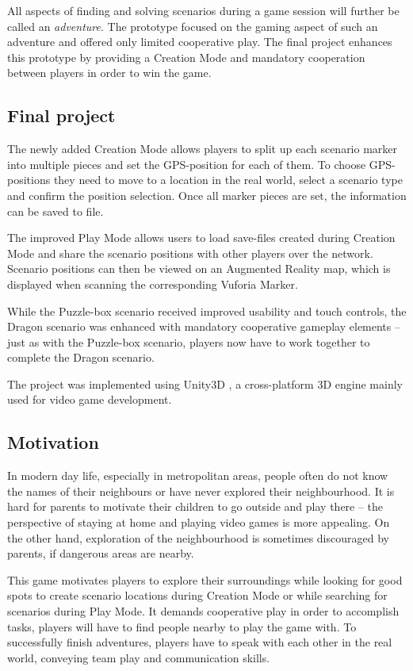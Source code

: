 \documentclass{sigchi-ext}
\begin{document}
All aspects of finding and solving scenarios during a game session will further be called an \textit{adventure}. The prototype focused on the gaming aspect of such an adventure and offered only limited cooperative play. The final project enhances this prototype by providing a Creation Mode and mandatory cooperation between players in order to win the game.

\subsection{Final project}

The newly added Creation Mode allows players to split up each scenario marker into multiple pieces and set the GPS-position for each of them. To choose GPS-positions they need to move to a location in the real world, select a scenario type and confirm the position selection. Once all marker pieces are set, the information can be saved to file.

The improved Play Mode allows users to load save-files created during Creation Mode and share the scenario positions with other players over the network. Scenario positions can then be viewed on an Augmented Reality map, which is displayed when scanning the corresponding Vuforia Marker.

While the Puzzle-box scenario received improved usability and touch controls, the Dragon scenario was enhanced with mandatory cooperative gameplay elements -- just as with the Puzzle-box scenario, players now have to work together to complete the Dragon scenario.

The project was implemented using Unity3D \cite{unity3d}, a cross-platform 3D engine mainly used for video game development. 

\subsection{Motivation}

In modern day life, especially in metropolitan areas, people often do not know the names of their neighbours or have never explored their neighbourhood. It is hard for
parents to motivate their children to go outside and play there -- the perspective of staying at home and playing video games is more appealing. On the other hand, exploration of the neighbourhood is sometimes discouraged by parents, if dangerous areas are nearby.

This game motivates players to explore their surroundings while looking for good spots to create scenario locations during Creation Mode or while searching for scenarios during Play Mode. It demands cooperative play in order to accomplish tasks, players will have to find people nearby
to play the game with. To successfully finish adventures, players have to speak with each other in the real world, conveying team play and communication skills. 
\end{document}
